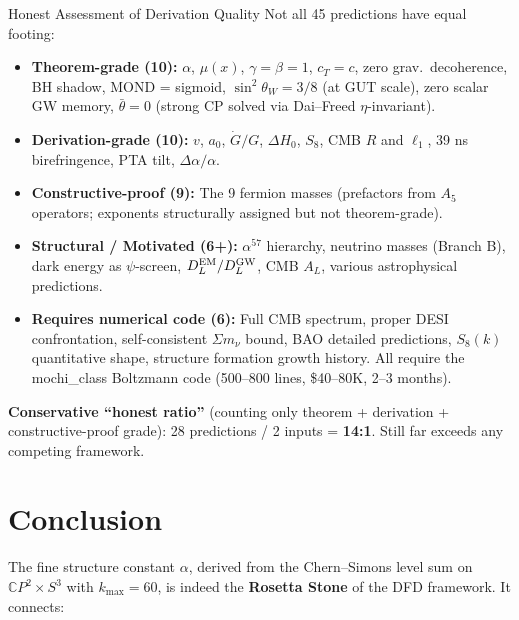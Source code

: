 \documentclass[12pt,a4paper]{article}
\newcommand{\CP}{\mathbb{C}P}
\begin{document}
\begin{honestbox}{Honest Assessment of Derivation Quality}
Not all 45 predictions have equal footing:

\begin{itemize}[nosep]
\item \textbf{Theorem-grade (10):} $\alpha$, $\mu(x)$, $\gamma = \beta = 1$,
  $c_T = c$, zero grav.\ decoherence, BH shadow, MOND = sigmoid,
  $\sin^2\theta_W = 3/8$ (at GUT scale), zero scalar GW memory,
  $\bar{\theta} = 0$ (strong CP solved via Dai--Freed $\eta$-invariant).

\item \textbf{Derivation-grade (10):} $v$, $a_0$, $\dot{G}/G$,
  $\Delta H_0$, $S_8$, CMB $R$ and $\ell_1$, 39 ns birefringence,
  PTA tilt, $\Delta\alpha/\alpha$.

\item \textbf{Constructive-proof (9):} The 9 fermion masses (prefactors
  from $A_5$ operators; exponents structurally assigned but not
  theorem-grade).

\item \textbf{Structural / Motivated (6+):} $\alpha^{57}$ hierarchy,
  neutrino masses (Branch B), dark energy as $\psi$-screen,
  $D_L^{\rm EM}/D_L^{\rm GW}$, CMB $A_L$, various astrophysical
  predictions.

\item \textbf{Requires numerical code (6):} Full CMB spectrum,
  proper DESI confrontation, self-consistent $\Sigma m_\nu$ bound,
  BAO detailed predictions, $S_8(k)$ quantitative shape, structure
  formation growth history.  All require the mochi\_class Boltzmann
  code (500--800 lines, \$40--80K, 2--3 months).
\end{itemize}

\textbf{Conservative ``honest ratio''} (counting only theorem +
derivation + constructive-proof grade): 28 predictions / 2 inputs
= \textbf{14:1}.  Still far exceeds any competing framework.
\end{honestbox}

\section{Conclusion}
\label{sec:conclusion}

The fine structure constant $\alpha$, derived from the Chern--Simons
level sum on $\CP^2 \times S^3$ with $k_{\max} = 60$, is indeed the
\textbf{Rosetta Stone} of the DFD framework.  It connects:
\end{document}
